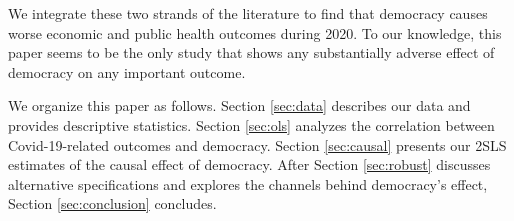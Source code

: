 We integrate these two strands of the literature to find that democracy causes worse economic and public health outcomes during 2020. To our knowledge, this paper seems to be the only study that shows any substantially adverse effect of democracy on any important outcome. 

We organize this paper as follows. Section \ref{sec:data} describes our data and provides descriptive statistics.  Section \ref{sec:ols} analyzes the correlation between Covid-19-related outcomes and democracy. Section \ref{sec:causal} presents our 2SLS estimates of the causal effect of democracy. After Section \ref{sec:robust} discusses alternative specifications and explores the channels behind democracy's effect, Section \ref{sec:conclusion} concludes. 
